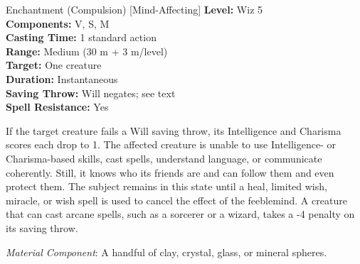 {Enchantment (Compulsion) [Mind-Affecting]}
{
	\textbf{Level:}
	Wiz 5\\
	\textbf{Components:}
	V, S, M\\
	\textbf{Casting Time:}
	1 standard action\\
	\textbf{Range:}
	Medium (30 m + 3 m/level)\\
	\textbf{Target:}
	One creature\\
	\textbf{Duration:}
	Instantaneous\\
	\textbf{Saving Throw:}
	Will negates; see text\\
	\textbf{Spell Resistance:}
	Yes\\
}
{
	If the target creature fails a Will saving throw, its Intelligence and Charisma scores each drop to 1. The affected creature is unable to use Intelligence- or Charisma-based skills, cast spells, understand language, or communicate coherently. Still, it knows who its friends are and can follow them and even protect them. The subject remains in this state until a heal, limited wish, miracle, or wish spell is used to cancel the effect of the feeblemind. A creature that can cast arcane spells, such as a sorcerer or a wizard, takes a -4 penalty on its saving throw.

	\textit{Material Component}:
	A handful of clay, crystal, glass, or mineral spheres.

}
